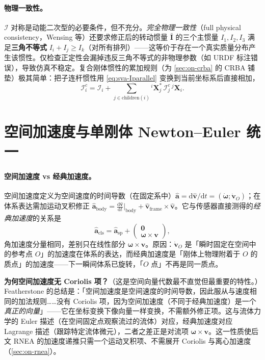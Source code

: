 \paragraph{物理一致性。}
$\mathcal I$ 对称是动能二次型的必要条件，但不充分。\emph{完全物理一致性}（full physical consistency，Wensing 等\cite{wensing2018linear}）还要求修正后的转动惯量 $\bar{\mathbf I}$ 的三个主惯量 $I_1,I_2,I_3$ 满足\textbf{三角不等式} $I_i+I_j\ge I_k$（对所有排列）——这等价于存在一个真实质量分布产生该惯性。仅检查正定性会漏掉违反三角不等式的非物理参数（如 URDF 标注错误），导致仿真不稳定。复合刚体惯性的累加规则（为 \cref{sec:on-crba} 的 CRBA 铺垫）极其简单：把子连杆惯性用 \cref{eq:sva-Iparallel} 变换到当前坐标系后直接相加，
\begin{equation}
  \mathcal I_i^c=\mathcal I_i+\sum_{j\in\text{children}(i)}{}^i\mathbf X_j^*\,\mathcal I_j^c\,{}^j\mathbf X_i.
  \label{eq:sva-Icomposite}
\end{equation}

\section{空间加速度与单刚体 Newton--Euler 统一}
\label{sec:sva-accel}

\paragraph{空间加速度 vs 经典加速度。}
空间加速度定义为空间速度的时间导数（在固定系中）$\hat{\mathbf a}=\mathrm d\hat{\mathbf v}/\mathrm dt=(\dot{\boldsymbol\omega};\dot{\mathbf v}_O)$；在体系表达需加运动叉积修正 $\hat{\mathbf a}_{\text{body}}=\frac{\mathrm d\hat{\mathbf v}}{\mathrm dt}|_{\text{body}}+\hat{\mathbf v}_{\text{frame}}\times\hat{\mathbf v}$。它与传感器直接测得的\emph{经典加速度}的关系是
\begin{equation}
  \hat{\mathbf a}_{\text{cls}}=\hat{\mathbf a}_{\text{sp}}+\begin{pmatrix}\mathbf 0\\ \boldsymbol\omega\times\mathbf v\end{pmatrix},
  \label{eq:sva-accel-cls}
\end{equation}
角加速度分量相同，差别只在线性部分 $\boldsymbol\omega\times\mathbf v$。原因：$\dot{\mathbf v}_O$ 是「瞬时固定在空间中的参考点 $O$」的加速度在体系的表达，而经典加速度是「刚体上物理附着于 $O$ 的质点」的加速度——下一瞬间体系已旋转，「$O$ 点」不再是同一质点。

\begin{insight}
\textbf{为何空间加速度无 Coriolis 项？}（这是空间向量代数最不直觉但最重要的特性。）Featherstone 的总结是：「空间加速度是空间速度的时间导数，因此服从与速度相同的加法规则……没有 Coriolis 项，因为空间加速度（不同于经典加速度）是一个\emph{真正的向量}」——它在坐标变换下像向量一样变换，不需额外修正项。这与流体力学的 Euler 描述（在空间固定点观察流过的流体）对应，经典加速度对应 Lagrange 描述（跟踪特定流体微元），二者之差正是对流项 $\boldsymbol\omega\times\mathbf v$。这一性质使后文 RNEA 的加速度递推只需一个运动叉积项、不需展开 Coriolis 与离心加速度（\cref{sec:on-rnea}）。
\end{insight}

